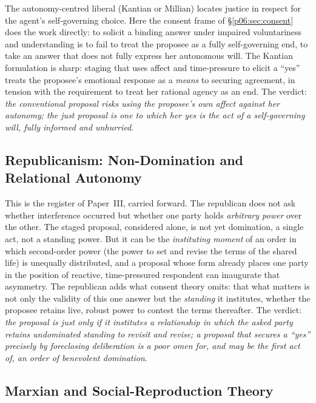 \documentclass[11pt,a4paper]{article}
\begin{document}
The autonomy-centred liberal (Kantian or Millian) locates justice in respect for the agent's self-governing choice. Here the consent frame of §\ref{p06:sec:consent} does the work directly: to solicit a binding answer under impaired voluntariness and understanding is to fail to treat the proposee as a fully self-governing end, to take an answer that does not fully express her autonomous will. The Kantian formulation is sharp: staging that uses affect and time-pressure to elicit a ``yes'' treats the proposee's emotional response as a \emph{means} to securing agreement, in tension with the requirement to treat her rational agency as an end. The verdict: \emph{the conventional proposal risks using the proposee's own affect against her autonomy; the just proposal is one to which her yes is the act of a self-governing will, fully informed and unhurried}.

\subsection{Republicanism: Non-Domination and Relational Autonomy}

This is the register of Paper~III, carried forward. The republican does not ask whether interference occurred but whether one party holds \emph{arbitrary power} over the other. The staged proposal, considered alone, is not yet domination, a single act, not a standing power. But it can be the \emph{instituting moment} of an order in which second-order power (the power to set and revise the terms of the shared life) is unequally distributed, and a proposal whose form already places one party in the position of reactive, time-pressured respondent can inaugurate that asymmetry. The republican adds what consent theory omits: that what matters is not only the validity of this one answer but the \emph{standing} it institutes, whether the proposee retains live, robust power to contest the terms thereafter. The verdict: \emph{the proposal is just only if it institutes a relationship in which the asked party retains undominated standing to revisit and revise; a proposal that secures a ``yes'' precisely by foreclosing deliberation is a poor omen for, and may be the first act of, an order of benevolent domination}.

\subsection{Marxian and Social-Reproduction Theory}
\end{document}
